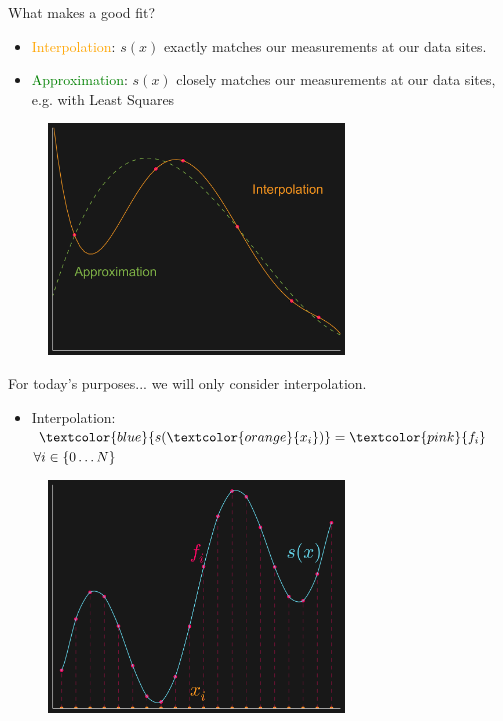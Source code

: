 \documentclass[12pt,t]{beamer}
\newcommand{\bi}{\begin{itemize}}
\newcommand{\ei}{\end{itemize}}
\newcommand{\subt}[1]{{\footnotesize \color{subtitle} {#1}}}
\begin{document}
\begin{frame}{What makes a good fit?}
\bi
\item \textcolor{orange}{Interpolation}: $s(x)$ \subt{exactly matches} our measurements at our data sites. \\ 
\item \textcolor{green}{Approximation}: $s(x)$ \subt{closely matches} our measurements at our data sites, e.g. with Least Squares 
\ei
\begin{figure}
\includegraphics[width=0.7\textwidth, keepaspectratio]{fig2.png}
\end{figure}

\note{}
\end{frame}

\begin{frame}{For today's purposes...}
we will only consider interpolation.

\bi
\item Interpolation: $\textcolor{blue}{s(\textcolor{orange}{x_i})}=\textcolor{pink}{f_i}$ $\forall i\in\{0 \mathellipsis N \}$
\ei
\begin{figure}
\includegraphics[width=0.7\textwidth, keepaspectratio]{fig1.png}
\end{figure}


\note{}
\end{frame}
\end{document}
